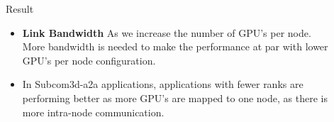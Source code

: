 \documentclass[final]{beamer}
\newlength{\sepwid}
\newlength{\onecolwid}
\newlength{\twocolwid}
\begin{document}
\begin{frame}[t]
\begin{columns}[t]
\begin{column}{\twocolwid}
\begin{columns}[t,totalwidth=\twocolwid]
\begin{column}{\onecolwid}






\end{column} %

\end{columns} %

\end{column} %

\begin{column}{\sepwid}\end{column} %

\begin{column}{\onecolwid} %


\begin{block}{Result}
\begin{itemize}

\item \textbf{Link Bandwidth} As we increase the number of GPU's per node. More bandwidth is needed to make the performance at par with lower GPU's per node configuration.
\vspace{\baselineskip}
\item In Subcom3d-a2a applications, applications with fewer ranks are performing better as more GPU's are mapped to one node, as there is more intra-node communication.
\end{itemize}
\end{block}




\end{column}
\end{columns}
\end{frame}
\end{document}
